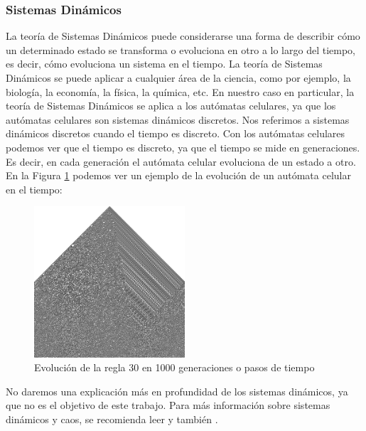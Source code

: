 \subsubsection{Sistemas Din\'amicos}
\label{sec:SistemasDinamicos}
    La teor\'ia de Sistemas Din\'amicos puede considerarse una forma de describir c\'omo un determinado estado
        se transforma o evoluciona en otro a lo largo del tiempo, es decir, c\'omo evoluciona un sistema en el tiempo.
        La teor\'ia de Sistemas Din\'amicos se puede aplicar a cualquier \'area de la ciencia, como por ejemplo,
        la biolog\'ia, la econom\'ia, la f\'isica, la qu\'imica, etc. En nuestro caso en particular, la teor\'ia de
        Sistemas Din\'amicos se aplica a los aut\'omatas celulares, ya que los aut\'omatas celulares son sistemas
        din\'amicos discretos.
    \vskip 0.5cm
    Nos referimos a sistemas din\'amicos discretos cuando el tiempo es discreto. Con los aut\'omatas celulares
        podemos ver que el tiempo es discreto, ya que el tiempo se mide en generaciones. Es decir, en cada generaci\'on
        el aut\'omata celular evoluciona de un estado a otro. En la Figura \ref{fig:automataCelularEvolucion} podemos
        ver un ejemplo de la evoluci\'on de un aut\'omata celular en el tiempo:
        \begin{figure}[h]
            \centering
            \includegraphics[width=0.5\textwidth]{./images/marco_teorico/automatas_celulares/Regla30-1000Gen.png}
            \caption{Evoluci\'on de la regla 30 en 1000 generaciones o pasos de tiempo}
            \label{fig:automataCelularEvolucion}
        \end{figure}
    \vskip 0.5cm
    No daremos una explicaci\'on m\'as en profundidad de los sistemas din\'amicos, ya que no es el objetivo de este
        trabajo. Para m\'as informaci\'on sobre sistemas din\'amicos y caos, se recomienda leer \cite{Ott1993} y tambi\'en \cite{Luenberger1979}.
